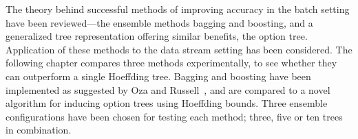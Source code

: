 The theory behind successful methods of improving accuracy in the batch setting have been reviewed---the ensemble methods bagging and boosting, and a generalized tree representation offering similar benefits, the option tree. Application of these methods to the data stream setting has been considered. The following chapter compares three methods experimentally, to see whether they can outperform a single Hoeffding tree. Bagging and boosting have been implemented as suggested by Oza and Russell~\cite{ozabagboost}, and are compared to a novel algorithm for inducing option trees using Hoeffding bounds. 
Three ensemble configurations have been chosen for testing each method; three, five or ten trees in combination.
\ENDOMIT